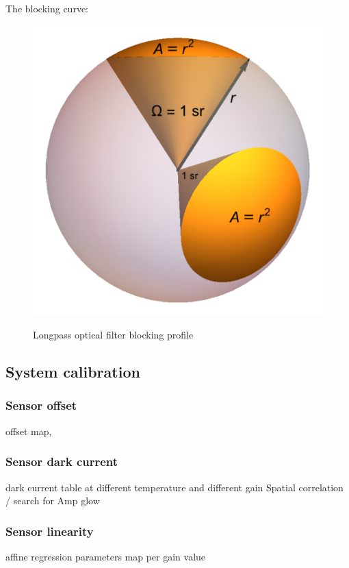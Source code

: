 \documentclass{article}
\begin{document}
  The blocking curve:
  \begin{figure}[h!]
    \includegraphics[width=1.0\textwidth]{../../figures/Solid_Angle_1_Steradian.png}\\
    \caption{Longpass optical filter blocking profile}
  \end{figure}


  \subsection{System calibration}
    \subsubsection{Sensor offset}
    offset map,
    \subsubsection{Sensor dark current}
    dark current table at different temperature and different gain
    Spatial correlation / search for Amp glow

    \subsubsection{Sensor linearity}
    affine regression parameters map per gain value
\end{document}
